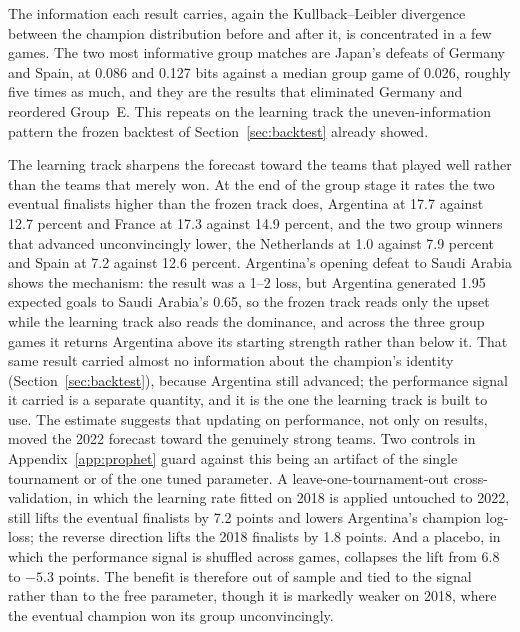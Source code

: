 \documentclass[11pt,letterpaper]{article}
\begin{document}
The information each result carries, again the Kullback--Leibler divergence between the champion distribution before and after it, is concentrated in a few games. The two most informative group matches are Japan's defeats of Germany and Spain, at 0.086 and 0.127 bits against a median group game of 0.026, roughly five times as much, and they are the results that eliminated Germany and reordered Group~E. This repeats on the learning track the uneven-information pattern the frozen backtest of Section~\ref{sec:backtest} already showed.

The learning track sharpens the forecast toward the teams that played well rather than the teams that merely won. At the end of the group stage it rates the two eventual finalists higher than the frozen track does, Argentina at 17.7 against 12.7 percent and France at 17.3 against 14.9 percent, and the two group winners that advanced unconvincingly lower, the Netherlands at 1.0 against 7.9 percent and Spain at 7.2 against 12.6 percent. Argentina's opening defeat to Saudi Arabia shows the mechanism: the result was a 1--2 loss, but Argentina generated 1.95 expected goals to Saudi Arabia's 0.65, so the frozen track reads only the upset while the learning track also reads the dominance, and across the three group games it returns Argentina above its starting strength rather than below it. That same result carried almost no information about the champion's identity (Section~\ref{sec:backtest}), because Argentina still advanced; the performance signal it carried is a separate quantity, and it is the one the learning track is built to use. The estimate suggests that updating on performance, not only on results, moved the 2022 forecast toward the genuinely strong teams. Two controls in Appendix~\ref{app:prophet} guard against this being an artifact of the single tournament or of the one tuned parameter. A leave-one-tournament-out cross-validation, in which the learning rate fitted on 2018 is applied untouched to 2022, still lifts the eventual finalists by 7.2 points and lowers Argentina's champion log-loss; the reverse direction lifts the 2018 finalists by 1.8 points. And a placebo, in which the performance signal is shuffled across games, collapses the lift from 6.8 to $-5.3$ points. The benefit is therefore out of sample and tied to the signal rather than to the free parameter, though it is markedly weaker on 2018, where the eventual champion won its group unconvincingly.
\end{document}
